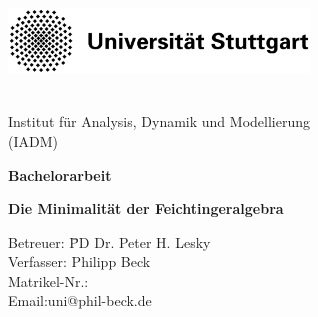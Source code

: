 \documentclass[12pt,twoside,a4paper]{scrartcl}
\author{Philipp Beck}
\numberwithin{equation}{section}
\theoremstyle{satz}
\theoremstyle{def}
\theoremstyle{exercise}
\newcommand{\blankpage}{
	\newpage
	\thispagestyle{empty}
	\mbox{}
	\newpage
}
\begin{document}
\thispagestyle{empty}
\begin{center}
	
	
	\hspace{-1.0cm}
	\includegraphics[width=0.6\textwidth]{uni_logo.png}
	\vspace{-0.6 cm}
	
	\hspace{2,2cm}
	\\[1cm]
	{\Large Institut für Analysis, Dynamik und Modellierung\\(IADM)}
	
	
	\vspace*{3cm}
	
	\Large{\textbf{Bachelorarbeit}\\
		
		\vspace{1cm}
		
		\textbf{\Large{Die Minimalität der Feichtingeralgebra}}
		
		\vspace*{1mm}
		
		
		\vspace{1.5cm}
		
		
		\parbox{120mm}{
			\begin{large}
				\begin{tabbing}
					Betreuer: \hspace{0.7cm} \= PD Dr. Peter H. Lesky\\[4mm]
					Verfasser:\> Philipp Beck\\ %
					Matrikel-Nr.:\\
					Email:\>uni@phil-beck.de\\
				\end{tabbing}
			\end{large}
		}}
	\end{center}
\blankpage	
\cleardoublepage
\setcounter{page}{1}
\end{document}
